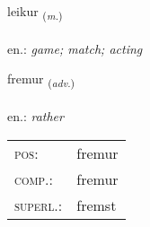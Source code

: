 \documentclass[frontgrid, backgrid]{flacards}\usepackage[]{graphicx}\usepackage[]{xcolor}
\begin{document}
\renewcommand{\blhead}{\vskip5pt {\small\bfseries\footnotesize Nafnorð | Noun }}
\renewcommand{\bcfoot}{\vskip5pt \hspace{2pt}{\small\bfseries\footnotesize 1K}}


{leikur \small{\textsubscript{(\textit{m.})}} \\[1ex] %
\textphonetic{[leiːkʏr]} \\
en.: \emph{game; match; acting} \\  [2ex]
\renewcommand*{\arraystretch}{0.8}
}

\renewcommand{\flhead}{\vskip5pt \fboxsep=0pt {\small\bfseries\footnotesize Atviksorð | Adverb}}
\renewcommand{\fcfoot}{\vskip5pt \fboxsep=0pt \hspace{2pt}{\small\bfseries\footnotesize 1K}}

\renewcommand{\blhead}{\vskip5pt {\small\bfseries\footnotesize Atviksorð | Adverb }}
\renewcommand{\bcfoot}{\vskip5pt \hspace{2pt}{\small\bfseries\footnotesize 1K}}


{fremur \small{\textsubscript{(\textit{adv.})}} \\[1ex] %
\textphonetic{[frɛːmʏr]} \\
en.: \emph{rather} \\  [2ex]
\renewcommand*{\arraystretch}{0.8}
\begin{tabular}{ll}
\textsc{pos}: & fremur \\ 
\textsc{comp.}: & fremur \\ 
\textsc{superl.}: & fremst \\
\end{tabular}
}

\renewcommand{\flhead}{\vskip5pt \fboxsep=0pt {\small\bfseries\footnotesize Nafnorð | Noun}}
\renewcommand{\fcfoot}{\vskip5pt \fboxsep=0pt \hspace{2pt}{\small\bfseries\footnotesize 1K}}
\end{document}
